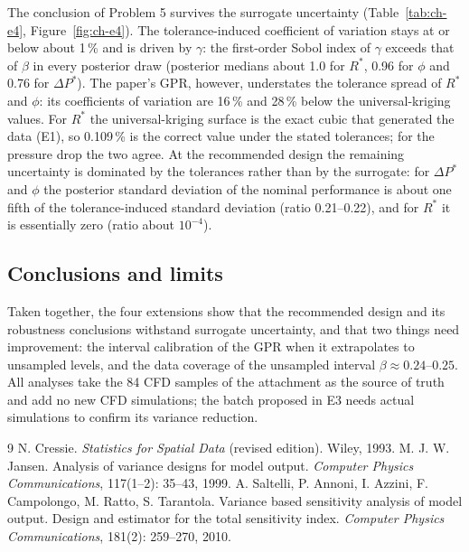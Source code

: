 The conclusion of Problem 5 survives the surrogate uncertainty (Table~\ref{tab:ch-e4}, Figure~\ref{fig:ch-e4}). The tolerance-induced coefficient of variation stays at or below about 1\,\% and is driven by $\gamma$: the first-order Sobol index of $\gamma$ exceeds that of $\beta$ in every posterior draw (posterior medians about 1.0 for $R^*$, 0.96 for $\phi$ and 0.76 for $\Delta P^*$). The paper's GPR, however, understates the tolerance spread of $R^*$ and $\phi$: its coefficients of variation are 16\,\% and 28\,\% below the universal-kriging values. For $R^*$ the universal-kriging surface is the exact cubic that generated the data (E1), so 0.109\,\% is the correct value under the stated tolerances; for the pressure drop the two agree. At the recommended design the remaining uncertainty is dominated by the tolerances rather than by the surrogate: for $\Delta P^*$ and $\phi$ the posterior standard deviation of the nominal performance is about one fifth of the tolerance-induced standard deviation (ratio 0.21--0.22), and for $R^*$ it is essentially zero (ratio about $10^{-4}$).

\subsection{Conclusions and limits}
Taken together, the four extensions show that the recommended design and its robustness conclusions withstand surrogate uncertainty, and that two things need improvement: the interval calibration of the GPR when it extrapolates to unsampled levels, and the data coverage of the unsampled interval $\beta\approx0.24$--$0.25$. All analyses take the 84 CFD samples of the attachment as the source of truth and add no new CFD simulations; the batch proposed in E3 needs actual simulations to confirm its variance reduction.

\begin{thebibliography}{9}
 N. Cressie. \emph{Statistics for Spatial Data} (revised edition). Wiley, 1993.
 M. J. W. Jansen. Analysis of variance designs for model output. \emph{Computer Physics Communications}, 117(1--2): 35--43, 1999.
 A. Saltelli, P. Annoni, I. Azzini, F. Campolongo, M. Ratto, S. Tarantola. Variance based sensitivity analysis of model output. Design and estimator for the total sensitivity index. \emph{Computer Physics Communications}, 181(2): 259--270, 2010.
\end{thebibliography}

